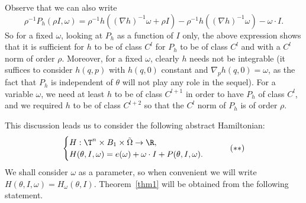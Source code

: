 \begin{remark}\label{reg}
Observe that we can also write
\[ \rho^{-1}P_h(\rho I,\omega)=\rho^{-1}h((\nabla h)^{-1}\omega+\rho I)-\rho^{-1}h((\nabla h)^{-1}\omega)-\omega\cdot I. \]
So for a fixed $\omega$, looking at $P_h$ as a function of $I$ only, the above expression shows that it is sufficient for $h$ to be of class $C^l$ for $P_h$ to be of class $C^l$ and with a $C^l$ norm of order $\rho$. Moreover, for a fixed $\omega$, clearly $h$ needs not be integrable (it suffices to consider $h(q,p)$ with $h(q,0)$ constant and $\nabla_p h(q,0)=\omega$, as the fact that $P_h$ is independent of $\theta$ will not play any role in the sequel). For a variable $\omega$, we need at least $h$ to be of class $C^{l+1}$ in order to have $P_h$ of class $C^l$, and we required $h$ to be of class $C^{l+2}$ so that the $C^l$ norm of $P_h$ is of order $\rho$.
\end{remark}

This discussion leads us to consider the following abstract Hamiltonian:
\begin{equation}\label{Ham2}
\begin{cases}
H : \T^n \times B_1 \times \tilde{\Omega} \to \R, \\
H(\theta,I,\omega)=e(\omega)+ \omega\cdot I + P(\theta,I,\omega).
\end{cases}\tag{$**$}
\end{equation}
We shall consider $\omega$ as a parameter, so when convenient we will write $H(\theta,I,\omega)=H_\omega(\theta,I)$. Theorem~\ref{thm1} will be obtained from the following statement.


